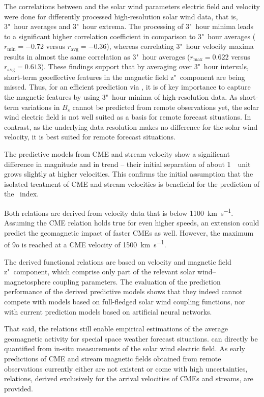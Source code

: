 \bigskip

The correlations between \Kp{} and the solar wind parameters electric field and velocity were done for differently processed high-resolution solar wind data, that is, 3"~hour averages and 3"~hour extrema. The processing of 3"~hour \vBz{} minima leads to a significant higher correlation coefficient in comparison to 3"~hour averages ($r_\text{min} = -0.72$ versus $r_\text{avg} = -0.36$), whereas correlating 3"~hour velocity maxima results in almost the same correlation as 3"~hour averages ($r_\text{max} = 0.622$ versus $r_\text{avg} = 0.613$).
These findings support that by averaging over 3"~hour intervals, short-term geoeffective features in the magnetic field z"~component are being missed. Thus, for an efficient \Kp{} prediction via \vBz{}, it is of key importance to capture the magnetic features by using 3"~hour minima of high-resolution data. As short-term variations in $B_\text{z}$ cannot be predicted from remote observations yet, the solar wind electric field is not well suited as a basis for remote forecast situations.
In contrast, as the underlying data resolution makes no difference for the solar wind velocity, it is best suited for remote forecast situations.

The \Kp{} predictive models from CME and stream velocity show a significant difference in magnitude and in trend -- their initial separation of about 1~\Kp~unit grows slightly at higher velocities. This confirms the initial assumption that the isolated treatment of CME and stream velocities is beneficial for the prediction of the \Kp~index.

Both relations are derived from velocity data that is below \SI{1100}{\km\per\s}. Assuming the CME relation holds true for even higher speeds, an extension could predict the geomagnetic impact of faster CMEs as well. However, the maximum \Kp{} of 9o is reached at a CME velocity of \SI{1500}{\km\per\s}.

The derived functional relations are based on velocity and magnetic field z"~component, which comprise only part of the relevant solar wind--magnetosphere coupling parameters. The evaluation of the prediction performance of the derived predictive models shows that they indeed cannot compete with models based on full-fledged solar wind coupling functions, nor with current prediction models based on artificial neural networks.

That said, the relations still enable empirical estimations of the average geomagnetic activity for special space weather forecast situations. \Kp{} can directly be quantified from in-situ measurements of the solar wind electric field. As early predictions of CME and stream magnetic fields obtained from remote observations currently either are not existent or come with high uncertainties, \Kp{} relations, derived exclusively for the arrival velocities of CMEs and streams, are provided.

